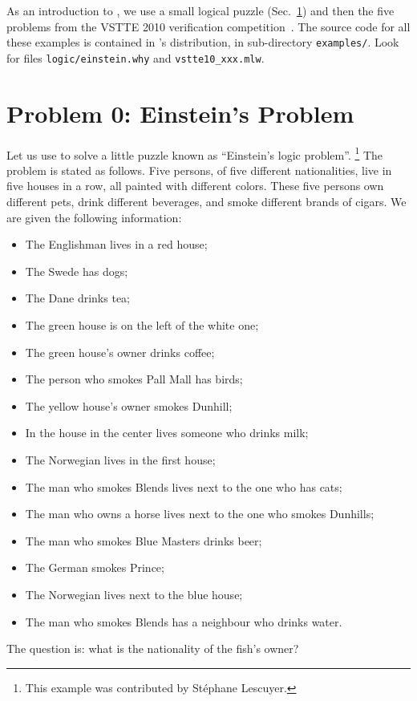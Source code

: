 \medskip
As an introduction to \whyml, we use a small logical puzzle
(Sec.~\ref{sec:Einstein}) and then the five problems from the VSTTE
2010 verification competition~\cite{vstte10comp}.
The source code for all these examples is contained in \why's
distribution, in sub-directory \texttt{examples/}. Look for files
\texttt{logic/einstein.why} and \texttt{vstte10\_xxx.mlw}.

\section{Problem 0: Einstein's Problem}
\label{sec:Einstein}

Let us use \why
to solve a little puzzle known as ``Einstein's logic
problem''.%
\footnote{This \why example was contributed by St\'ephane Lescuyer.}
The problem is stated as follows. Five persons, of five
different nationalities, live in five houses in a row, all
painted with different colors.
These five persons own different pets, drink different beverages, and
smoke different brands of cigars.
We are given the following information:
\begin{itemize}
\item The Englishman lives in a red house;

\item The Swede has dogs;

\item The Dane drinks tea;

\item The green house is on the left of the white one;

\item The green house's owner drinks coffee;

\item The person who smokes Pall Mall has birds;

\item The yellow house's owner smokes Dunhill;

\item In the house in the center lives someone who drinks milk;

\item The Norwegian lives in the first house;

\item The man who smokes Blends lives next to the one who has cats;

\item The man who owns a horse lives next to the one who smokes Dunhills;

\item The man who smokes Blue Masters drinks beer;

\item The German smokes Prince;

\item The Norwegian lives next to the blue house;

\item The man who smokes Blends has a neighbour who drinks water.
\end{itemize}
The question is: what is the nationality of the fish's owner?

